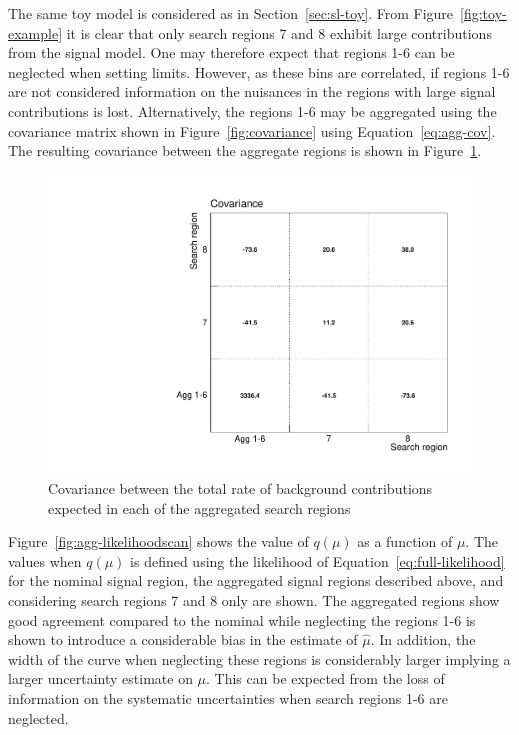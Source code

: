 The same toy model is considered as in Section~\ref{sec:sl-toy}. From Figure~\ref{fig:toy-example}
it is clear that only search regions 7 and 8 exhibit large contributions from the signal
model. One may therefore expect that regions 1-6 can be neglected when setting limits. 
However, as these bins are correlated, if regions 1-6 are not considered information 
on the nuisances in the regions with large signal contributions is lost. 
Alternatively, the regions 1-6 may be aggregated using the covariance matrix shown in 
Figure~\ref{fig:covariance} using Equation~\ref{eq:agg-cov}. The resulting covariance
between the aggregate regions is shown in Figure~\ref{fig:agg-covariance}.

\begin{figure}[hbt]
  \begin{center} 
   \includegraphics[width=1.5\cmsFigWidth]{figures/agg_htsearch_covariance.pdf}
   \caption{Covariance between the total rate of background contributions expected in each of the aggregated search regions}
   \label{fig:agg-covariance} 
  \end{center}
\end{figure}

Figure~\ref{fig:agg-likelihoodscan} shows the value of $q(\mu)$ as a function of $\mu$. The values when $q(\mu)$ 
is defined using the likelihood of Equation~\ref{eq:full-likelihood} for the nominal signal region, the aggregated signal
regions described above, and considering search regions 7 and 8 only are shown. The aggregated regions show
good agreement compared to the nominal while neglecting the regions 1-6 is shown to introduce a considerable
bias in the estimate of $\hat{\mu}$. In addition, the width of the curve when neglecting these regions is considerably
larger implying a larger uncertainty estimate on $\mu$. This can be expected from the loss of information on
the systematic uncertainties when search regions 1-6 are neglected.

